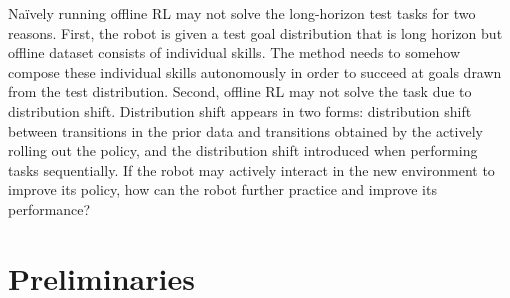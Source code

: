Na\"ively running offline RL may not solve the long-horizon test tasks for two reasons.
First, the robot is given a test goal distribution that is long horizon but offline dataset consists of individual skills.
The method needs to somehow compose these individual skills autonomously in order to succeed at goals drawn from the test distribution.
Second, offline RL may not solve the task due to distribution shift.
Distribution shift appears in two forms: distribution shift between transitions in the prior data and transitions obtained by the actively rolling out the policy, and the distribution shift introduced when performing tasks sequentially.
If the robot may actively interact in the new environment to improve its policy, how can the robot further practice and improve its performance?

\section{Preliminaries}
\label{sec:preliminaries}


